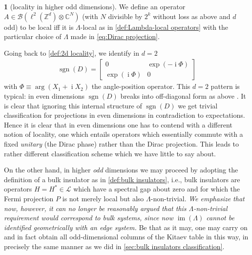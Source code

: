 \documentclass[a4paper,10pt]{article}
\numberwithin{equation}{section}
\theoremstyle{plain}
\theoremstyle{plain}
\theoremstyle{plain}
\theoremstyle{plain}
\theoremstyle{plain}
\theoremstyle{remark}
\theoremstyle{definition}
\newtheorem{defn}[thm]{\protect\definitionname}
\theoremstyle{plain}
\providecommand{\definitionname}{Definition}
\newcommand{\ii}{\operatorname{i}}
\newcommand{\ZZ}{\mathbb{Z}}
\newcommand{\CC}{\mathbb{C}}
\newcommand{\calB}{\mathcal{B}}
\newcommand{\calL}{\mathcal{L}}
\newcommand{\sgn}{\operatorname{sgn}}
\newcommand{\im}{\operatorname{im}}
\newcommand{\eq}[1]{\begin{align*}#1\end{align*}}
\begin{document}
	
	\begin{defn}[locality in higher odd dimensions] We define an operator  $A\in\calB(\ell^2(\ZZ^d)\otimes\CC^N)$ (with $N$ divisible by $2^k$ without loss as above and $d$ odd) to be local iff it is $\Lambda$-local as in \cref{def:Lambda-local operators} with the particular choice of $\Lambda$ made in \cref{eq:Dirac projection}.
	\end{defn}
	Going back to \cref{def:2d locality}, we identify in $d=2$\eq{\sgn(D)=\begin{bmatrix}
			0 & \exp\left(-\ii\Phi\right) \\ \exp\left(\ii\Phi\right) & 0
	\end{bmatrix}} with $\Phi\equiv\arg(X_1+\ii X_2)$ the angle-position operator. This $d=2$ pattern is typical: in even dimensions $\sgn(D)$ breaks into off-diagonal form as above \cite[Chapter 6]{PSB_2016}. It is clear that ignoring this internal structure of $\sgn(D)$ we get trivial classification for projections in even dimensions in contradiction to expectations. Hence it is clear that in even dimensions one has to contend with a different notion of locality, one which entails operators which essentially commute with a fixed \emph{unitary} (the Dirac phase) rather than the Dirac projection. This leads to rather different classification scheme which we have little to say about. 
	
	On the other hand, in higher \emph{odd} dimensions we may proceed by adopting the definition of a bulk insulator as in \cref{def:bulk insulators}, i.e., bulk insulators are operators $H=H^\ast\in\calL$ which have a spectral gap about zero and for which the Fermi projection $P$ is not merely local but also $\Lambda$-non-trivial. \emph{We emphasize that now, however, it can no longer be reasonably argued that this $\Lambda$-non-trivial requirement would correspond to bulk systems, since now $\im(\Lambda)$ cannot be identified geometrically with an edge system.} Be that as it may, one may carry on and in fact obtain all odd-dimensional columns of the Kitaev table in this way, in precisely the same manner as we did in \cref{sec:bulk insulators classification}.
	
\end{document}

